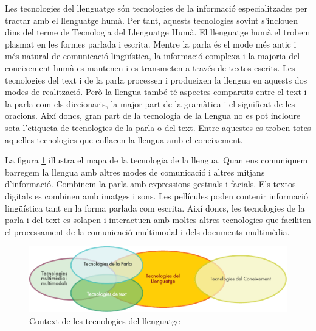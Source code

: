 \clearpage



\begin{multicols}{2}

Les tecnologies del llenguatge són tecnologies de la informació especialitzades per tractar amb el llenguatge humà. Per tant, aquests tecnologies sovint s’inclouen dins del terme de Tecnologia del Llenguatge Humà. El llenguatge humà el trobem plasmat en les formes parlada i escrita. Mentre la parla és el mode més antic i més natural de comunicació lingüística, la informació complexa i la majoria del coneixement humà es mantenen i es transmeten a través de textos escrits. Les tecnologies del text i de la parla processen i produeixen la llengua en aquests dos modes de realització. Però la llengua també té aspectes compartits entre el text i la parla com els diccionaris, la major part de la gramàtica i el significat de les oracions. Així doncs, gran part de la tecnologia de la llengua no es pot incloure sota l’etiqueta de tecnologies de la parla o del text. Entre aquestes es troben totes aquelles tecnologies que enllacen la llengua amb el coneixement.

 La figura \ref{fig:ltincontext_ca} iŀlustra el mapa de la tecnologia de la llengua. Quan ens comuniquem barregem la llengua amb altres modes de comunicació i altres mitjans d’informació. Combinem la parla amb expressions gestuals i facials. Els textos digitals es combinen amb imatges i sons. Les peŀlícules poden contenir informació lingüística tant en la forma parlada com escrita. Així doncs, les tecnologies de la parla i del text es solapen i interactuen amb moltes altres tecnologies que faciliten el processament de la comunicació multimodal i dels documents multimèdia.

\begin{figure}[htb]
  \vspace{-25mm}
  \center
  \includegraphics[width=\textwidth]{../_media/catalan/language_technologies}
  \caption{Context de les tecnologies del llenguatge}
  \label{fig:ltincontext_ca}
\end{figure}



\end{multicols}
